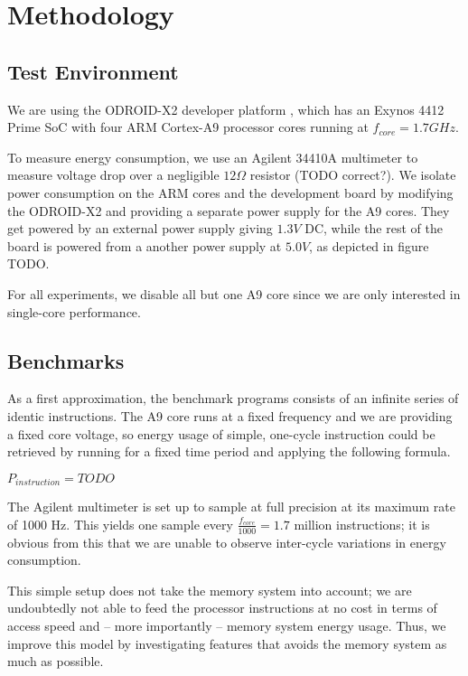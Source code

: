 \section{Methodology}
\subsection{Test Environment}
We are using the ODROID-X2 developer platform \cite{odroid-x2}, which has an
Exynos 4412 Prime SoC with four ARM Cortex-A9 processor cores running at
$f_{core} = 1.7 GHz$.


To measure energy consumption, we use an Agilent 34410A multimeter to measure
voltage drop over a negligible $12 \Omega$ resistor (TODO correct?). We isolate
power consumption on the ARM cores and the development board by modifying the
ODROID-X2 and providing a separate power supply for the A9 cores. They get
powered by an external power supply giving $1.3V$ DC, while the rest of the
board is powered from a another power supply at $5.0V$, as depicted in figure
TODO.

For all experiments, we disable all but one A9 core since we are only interested
in single-core performance.

\subsection{Benchmarks}
As a first approximation, the benchmark programs consists of an infinite series
of identic instructions. The A9 core runs at a fixed frequency and we are
providing a fixed core voltage, so energy usage of simple, one-cycle instruction
could be retrieved by running for a fixed time period and applying the following
formula.

\begin{center}
$P_{instruction} = TODO$
\end{center}

The Agilent multimeter is set up to sample at full precision at its maximum rate
of 1000 Hz. This yields one sample every $\frac{ f_{core} }{ 1000 } = 1.7$
million instructions; it is obvious from this that we are unable to observe
inter-cycle variations in energy consumption.

This simple setup does not take the memory system into account; we are
undoubtedly not able to feed the processor instructions at no cost in terms of
access speed and -- more importantly -- memory system energy usage. Thus, we
improve this model by investigating features that avoids the memory system as
much as possible.

